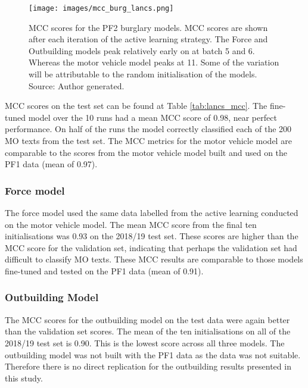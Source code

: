 \begin{figure}[!tbp]
  \centering
    \texttt{[image: images/mcc\_burg\_lancs.png]}
    \caption[MCC scores for the PF2 burglary models.]{{MCC scores for the PF2 burglary models.} MCC scores are shown after each iteration of the active learning strategy. The Force and Outbuilding models peak relatively early on at batch 5 and 6. Whereas the motor vehicle model peaks at 11. Some of the variation will be attributable to the random initialisation of the models. Source: Author generated.}
    \label{fig:mcc_burg_lancs}
\end{figure}


MCC scores on the test set can be found at Table \ref{tab:lancs_mcc}. The fine-tuned model over the 10 runs had a mean MCC score of 0.98, near perfect performance. On half of the runs the model correctly classified each of the 200 MO texts from the test set. The MCC metrics for the motor vehicle model are comparable to the scores from the motor vehicle model built and used on the PF1 data (mean of 0.97). 

\subsubsection{Force model} The force model used the same data labelled from the active learning conducted on the motor vehicle model. The mean MCC score from the final ten initialisations was 0.93 on the 2018/19 test set. These scores are higher than the MCC score for the validation set, indicating that perhaps the validation set had difficult to classify MO texts.  These MCC results are comparable to those models fine-tuned and tested on the PF1 data (mean of 0.91). 


\subsubsection{Outbuilding Model} The MCC scores for the outbuilding model on the test data were again better than the validation set scores. The mean of the ten initialisations on all of the 2018/19 test set is 0.90. This is the lowest score across all three models. The outbuilding model was not built with the PF1 data as the data was not suitable. Therefore there is no direct replication for the outbuilding results presented in this study.




